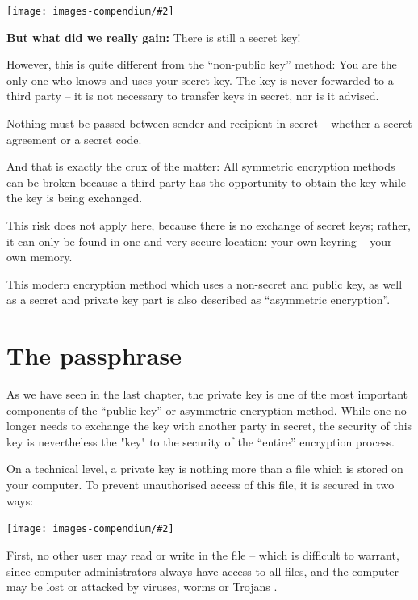 \documentclass[a4paper,11pt,oneside,openright,titlepage]{scrbook}
\newcommand{\IncludeImage}[2][]{
\begin{center}
  \texttt{[image: images-compendium/\#2]}%
\end{center}
}
\begin{document}
\enlargethispage{2\baselineskip}


\IncludeImage[width=0.75\textwidth]{pk-safe-opened-with-sk}

\clearpage
\textbf{But what did we really gain:} There is still a secret
key!



However, this is quite different from the ``non-public key'' method:
You are the only one who knows and uses your secret key. The key is
never forwarded to a third party  ­-- it is not necessary to transfer
keys in secret, nor is it advised.

Nothing must be passed between sender and recipient in secret --
whether a secret agreement or a secret code.

And that is exactly the crux of the matter: All symmetric encryption
methods can be broken because a third party has the opportunity to
obtain the key while the key is being exchanged.

This risk does not apply here, because there is no exchange of secret
keys; rather, it can only be found in one and very secure location:
your own keyring -- your own memory.

This modern encryption method which uses a non-secret and public key,
as well as a secret and private key part is also described as
``asymmetric encryption''. 


\clearpage
\chapter{The passphrase}
\label{ch:passphrase}

As we have seen in the last chapter, the private key is one of the
most important components of the ``public key'' or asymmetric
encryption method. While one no longer needs to exchange the key with
another party in secret, the security of this key is nevertheless the
"key"  to the security of the ``entire'' encryption process.

On a technical level, a private key is nothing more than a file which
is stored on your computer. To prevent unauthorised access of this
file, it is secured in two ways:


\IncludeImage[width=0.5\textwidth]{think-passphrase}

First, no other user may read or write in the file -- which is
difficult to warrant, since computer administrators always have access
to all files, and the computer may be lost or attacked
by viruses, worms or
Trojans .
\end{document}
